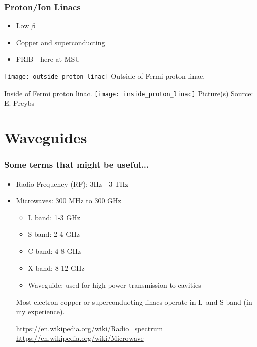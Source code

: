 \documentclass[professionalfonts,t]{beamer}
\begin{document}
\begin{frame}
	\frametitle{Proton/Ion Linacs}

\begin{minipage}{0.45\textwidth}
	\begin{itemize}
		\item Low $\beta$
		\item Copper and superconducting
		\item FRIB - here at MSU
	\end{itemize}
	\centering

	\texttt{[image: outside\_proton\_linac]}
	Outside of Fermi proton linac.
\end{minipage}\hfill
\begin{minipage}{0.45\textwidth}
	\vspace{-1em}
	\centering
	Inside of Fermi proton linac.
	\texttt{[image: inside\_proton\_linac]}
	Picture(s) Source: E. Preybs
\end{minipage}
\end{frame}



\section{Waveguides}
\begin{frame}
\frametitle{Some terms that might be useful...}
\begin{itemize}
	\item Radio Frequency (RF): 3Hz - 3 THz
	\item Microwaves: 300 MHz to 300 GHz 
	\begin{itemize}
		\item L band: 1-3 GHz
		\item S band: 2-4 GHz
		\item C band: 4-8 GHz
		\item X band: 8-12 GHz
	\item Waveguide: used for high power transmission to cavities
	\end{itemize}

\vspace{1em}

Most electron copper or superconducting linacs 
operate in L~and S band (in my experience). 

\vspace{1em}
\url{https://en.wikipedia.org/wiki/Radio_spectrum}
\url{https://en.wikipedia.org/wiki/Microwave}
\end{itemize}
\end{frame}
\end{document}
